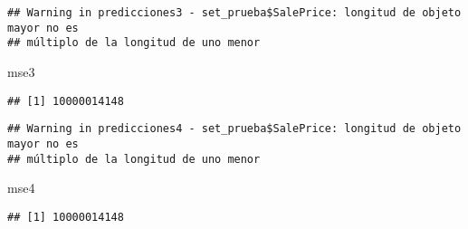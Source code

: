 \documentclass[
]{article}
\newenvironment{Shaded}{\begin{snugshade}}{\end{snugshade}}
\newcommand{\AttributeTok}[1]{\textcolor[rgb]{0.77,0.63,0.00}{#1}}
\newcommand{\DecValTok}[1]{\textcolor[rgb]{0.00,0.00,0.81}{#1}}
\newcommand{\FunctionTok}[1]{\textcolor[rgb]{0.00,0.00,0.00}{#1}}
\newcommand{\NormalTok}[1]{#1}
\newcommand{\OtherTok}[1]{\textcolor[rgb]{0.56,0.35,0.01}{#1}}
\newcommand{\SpecialCharTok}[1]{\textcolor[rgb]{0.00,0.00,0.00}{#1}}
\begin{document}
\begin{verbatim}
## Warning in predicciones3 - set_prueba$SalePrice: longitud de objeto mayor no es
## múltiplo de la longitud de uno menor
\end{verbatim}

\begin{Shaded}
\begin{Highlighting}[]
\NormalTok{mse3}
\end{Highlighting}
\end{Shaded}

\begin{verbatim}
## [1] 10000014148
\end{verbatim}

\begin{Shaded}
\end{Shaded}

\begin{verbatim}
## Warning in predicciones4 - set_prueba$SalePrice: longitud de objeto mayor no es
## múltiplo de la longitud de uno menor
\end{verbatim}

\begin{Shaded}
\begin{Highlighting}[]
\NormalTok{mse4}
\end{Highlighting}
\end{Shaded}

\begin{verbatim}
## [1] 10000014148
\end{verbatim}
\end{document}
